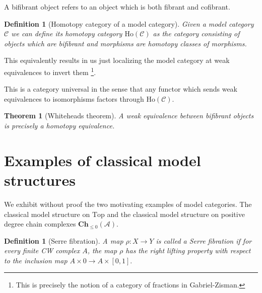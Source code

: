 \documentclass[12pt]{report}
\numberwithin{equation}{section}
\newtheorem{theorem}[dummy]{Theorem}
\newtheorem{definition}[dummy]{Definition}
\begin{document}
	A bifibrant object refers to an object which is both fibrant and cofibrant.
	
	\begin{definition}[Homotopy category of a model category]
		Given a model category \( \mathcal{C} \) we can define its homotopy category \( \mathrm{Ho}(\mathcal{C}) \) as the category consisting of objects which are bifibrant and morphisms are homotopy classes of morphisms.
	\end{definition}
	This equivalently results in us just localizing the model category at weak equivalences to invert them \footnote{This is precisely the notion of a category of fractions in Gabriel-Zisman.}.
	
	This is a category universal in the sense that any functor which sends weak equivalences to isomorphisms factors through \( \mathrm{Ho}(\mathcal{C}) \).
	
	\begin{theorem}[Whiteheads theorem]
		A weak equivalence between bifibrant objects is precisely a homotopy equivalence.	
	\end{theorem}

	
	\section{Examples of classical model structures}
	We exhibit without proof the two motivating examples of model categories. The classical model structure on $\mathrm{Top}$ and the classical model structure on positive degree chain complexes $\mathbf{Ch}_{\leq0}(\mathcal{A}).$
	

%	
	\begin{definition}[Serre fibration]
		A map $\rho: X \to Y$ is called a Serre fibration if for every finite CW complex $A$, the map $\rho$ has the right lifting property with respect to the inclusion map $A \times 0  \to A \times [0,1].$
	\end{definition}
	
\end{document}
